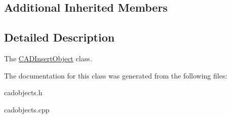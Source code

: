 \subsection*{Additional Inherited Members}


\subsection{Detailed Description}
The \hyperlink{class_c_a_d_insert_object}{C\+A\+D\+Insert\+Object} class. 

The documentation for this class was generated from the following files\+:\begin{DoxyCompactItemize}
\item 
cadobjects.\+h\item 
cadobjects.\+cpp\end{DoxyCompactItemize}
